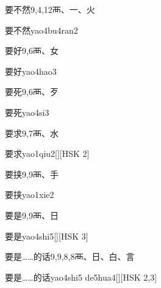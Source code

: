 \begin{entry}{要不然}{9,4,12}{⾑、⼀、⽕}
  \begin{phonetics}{要不然}{yao4bu4ran2}
  \end{phonetics}
\end{entry}

\begin{entry}{要好}{9,6}{⾑、⼥}
  \begin{phonetics}{要好}{yao4hao3}
  \end{phonetics}
\end{entry}

\begin{entry}{要死}{9,6}{⾑、⽍}
  \begin{phonetics}{要死}{yao4si3}
  \end{phonetics}
\end{entry}

\begin{entry}{要求}{9,7}{⾑、⽔}
  \begin{phonetics}{要求}{yao1qiu2}[][HSK 2]
  \end{phonetics}
\end{entry}

\begin{entry}{要挟}{9,9}{⾑、⼿}
  \begin{phonetics}{要挟}{yao1xie2}
  \end{phonetics}
\end{entry}

\begin{entry}{要是}{9,9}{⾑、⽇}
  \begin{phonetics}{要是}{yao4shi5}[][HSK 3]
  \end{phonetics}
\end{entry}

\begin{entry}{要是……的话}{9,9,8,8}{⾑、⽇、⽩、⾔}
  \begin{phonetics}{要是……的话}{yao4shi5 de5hua4}[][HSK 2,3]
  \end{phonetics}
\end{entry}

